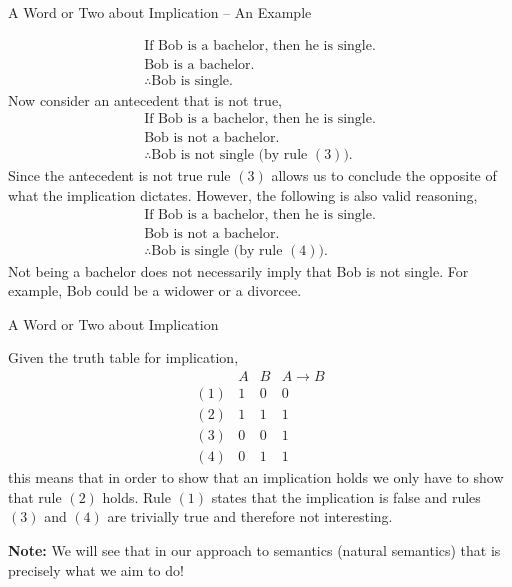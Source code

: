 \documentclass{beamer}
\begin{document}
\begin{frame}{A Word or Two about Implication -- An Example}

{\scriptsize
\[
\begin{array}{l}
\mbox{If Bob is a bachelor, then he is single.}\\
\mbox{Bob is a bachelor.}\\ \hline
\therefore\mbox{Bob is single.}
\end{array}
\]
}
Now consider an antecedent that is not true,
{\scriptsize
\[
\begin{array}{l}
\mbox{If Bob is a bachelor, then he is single.}\\
\mbox{Bob is not a bachelor.}\\ \hline
\therefore\mbox{Bob is not single (by rule $(3)$).}
\end{array}
\]
}
Since the antecedent is not true rule $(3)$ allows us to conclude the
opposite of what the implication dictates.  However, the following is also
valid reasoning,
{\scriptsize
\[
\begin{array}{l}
\mbox{If Bob is a bachelor, then he is single.}\\
\mbox{Bob is not a bachelor.}\\ \hline
\therefore\mbox{Bob is  single (by rule $(4)$).}
\end{array}
\]
}
Not being a bachelor does not necessarily imply that Bob is not single.  For example,
Bob could be a widower or a divorcee.
\end{frame}

\begin{frame}{A Word or Two about Implication}

Given the truth table for implication,
\[
\begin{array}{lcc|c}
&A & B & A \rightarrow B\\ \hline
(1)& 1 & 0 & 0\\
(2) & 1 & 1 & 1\\
(3) & 0 & 0 & 1\\
(4) & 0 & 1 & 1
\end{array}
\]
this means that in order to show that an implication holds we only have to show that rule $(2)$
holds.  Rule $(1)$ states that the implication is false and rules $(3)$ and $(4)$ are trivially true and
therefore not interesting.

\vspace{.1in}
{\bf Note:} We will see that in our approach to semantics (natural semantics) that is precisely what we aim to do!
\end{frame}
\end{document}
